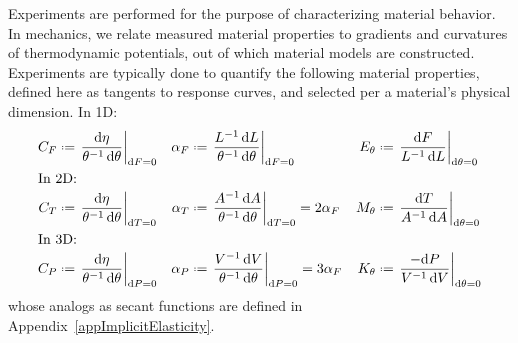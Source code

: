 Experiments are performed for the purpose of characterizing material behavior.  In mechanics, we relate measured material properties to gradients and curvatures of thermo\-dynamic potentials, out of which material models are constructed.  Experiments are typically done to quantify the following material properties, defined here as tangents to response curves, and selected per a material's physical dimension. 
\newline
In 1D:
\begin{subequations}
    \label{materialConstants}
    \begin{align}
    C_F & \defeq \left. \frac{\mathrm{d} \eta}
    {\theta^{-1} \, \mathrm{d}\theta} \right|_{\mathrm{d}F=0} & 
    \alpha_F & \defeq \left. \frac{L^{-1} \, \mathrm{d}L}
    {\theta^{-1} \, \mathrm{d} \theta} \right|_{\mathrm{d}F=0} &
    E_{\theta} & \defeq \left. \frac{\mathrm{d}F}
    {L^{-1} \, \mathrm{d}L} \right|_{\mathrm{d}\theta=0} \\
    \intertext{In 2D:}
    C_T & \defeq \left. \frac{\mathrm{d} \eta}
    {\theta^{-1} \, \mathrm{d}\theta} \right|_{\mathrm{d}T=0} & 
    \alpha_T & \defeq \left. \frac{A^{-1} \, \mathrm{d}A}
    {\theta^{-1} \, \mathrm{d} \theta} \right|_{\mathrm{d}T=0} =
    2 \alpha_F &
    M_{\theta} & \defeq \left. \frac{\mathrm{d}T}
    {A^{-1} \, \mathrm{d}A} \right|_{\mathrm{d}\theta=0} \\
    \intertext{In 3D:}
    C_P & \defeq \left. \frac{\mathrm{d} \eta}
    {\theta^{-1} \, \mathrm{d}\theta} \right|_{\mathrm{d}P=0} & 
    \alpha_P & \defeq \left. \frac{V^{-1} \, \mathrm{d}V}
    {\theta^{-1} \, \mathrm{d} \theta} \right|_{\mathrm{d}P=0} = 
    3 \alpha_F &
    K_{\theta} & \defeq \left. \frac{-\mathrm{d}P}
    {V^{-1} \, \mathrm{d}V} \right|_{\mathrm{d}\theta=0} 
    \end{align}
\end{subequations}
whose analogs as secant functions are defined in Appendix~\ref{appImplicitElasticity}.

